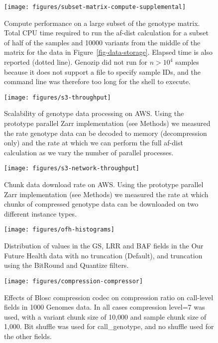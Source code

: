 \documentclass[a4paper,num-refs]{oup-contemporary}
\begin{document}
\begin{figure}[h]
\texttt{[image: figures/subset-matrix-compute-supplemental]}
\caption{Compute performance on a large subset of the genotype matrix.
Total CPU time required to run the af-dist calculation for
a subset of half of the samples and 10000 variants from the middle of the matrix
for the data in Figure~\ref{fig-data-storage}.
Elapsed time is also reported (dotted line).
Genozip did not run for
$n > 10^4$ samples because it does not support a file to specify
sample IDs, and the command line was therefore too long for the shell
to execute.
\label{fig-subset-matrix-compute-supplemental}}
\end{figure}

\begin{figure}[h]
\texttt{[image: figures/s3-throughput]}
\caption{Scalability of genotype data processing on AWS.
Using the prototype parallel Zarr implementation (see Methods) we 
measured the rate genotype data can be decoded to memory (decompression
only) and the rate at which we can perform the full af-dist
calculation as we vary the number of parallel processes.
\label{fig-s3-throughput}}
\end{figure}

\begin{figure}[h]
\texttt{[image: figures/s3-network-throughput]}
\caption{Chunk data download rate on AWS.
Using the prototype parallel Zarr implementation (see Methods) we 
measured the rate at which chunks of compressed genotype data 
can be downloaded on two different instance types.
\label{fig-s3-network-throughput}}
\end{figure}

\begin{figure}[h]
\texttt{[image: figures/ofh-histograms]}
\caption{Distribution of values in the GS, LRR and BAF fields in the Our Future
Health data with no truncation (Default), and truncation using the BitRound
and Quantize filters.
\label{fig-ofh-field-distributions}}
\end{figure}

\begin{figure}[h]
\texttt{[image: figures/compression-compressor]}
\caption{Effects of Blosc compression codec on compression ratio on call-level
fields in 1000 Genomes data.
In all cases compression level=7 was used, with a variant
chunk size of 10,000 and sample chunk size of 1,000.
Bit shuffle was used for call\_genotype, and no shuffle used for the other fields.
\label{fig-compression-compressor}}
\end{figure}
\end{document}
